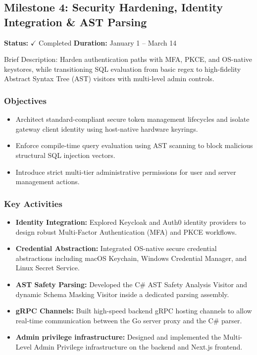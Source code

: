 
\subsection{Milestone 4: Security Hardening, Identity Integration \& AST Parsing}
\textbf{Status:} $\checkmark$ Completed \hfill \textbf{Duration:} January 1 -- March 14

Brief Description: Harden authentication paths with MFA, PKCE, and OS-native keystores, while transitioning SQL evaluation from basic regex to high-fidelity Abstract Syntax Tree (AST) visitors with multi-level admin controls.

\subsubsection{Objectives}
\begin{itemize}
    \item Architect standard-compliant secure token management lifecycles and isolate gateway client identity using host-native hardware keyrings.
    \item Enforce compile-time query evaluation using AST scanning to block malicious structural SQL injection vectors.
    \item Introduce strict multi-tier administrative permissions for user and server management actions.
\end{itemize}

\subsubsection{Key Activities}
\begin{itemize}
    \item \textbf{Identity Integration:} Explored Keycloak and Auth0 identity providers to design robust Multi-Factor Authentication (MFA) and PKCE workflows.
    \item \textbf{Credential Abstraction:} Integrated OS-native secure credential abstractions including macOS Keychain, Windows Credential Manager, and Linux Secret Service.
    \item \textbf{AST Safety Parsing:} Developed the C\# AST Safety Analysis Visitor and dynamic Schema Masking Visitor inside a dedicated parsing assembly.
    \item \textbf{gRPC Channels:} Built high-speed backend gRPC hosting channels to allow real-time communication between the Go server proxy and the C\# parser.
    \item \textbf{Admin privilege infrastructure:} Designed and implemented the Multi-Level Admin Privilege infrastructure on the backend and Next.js frontend.
\end{itemize}

